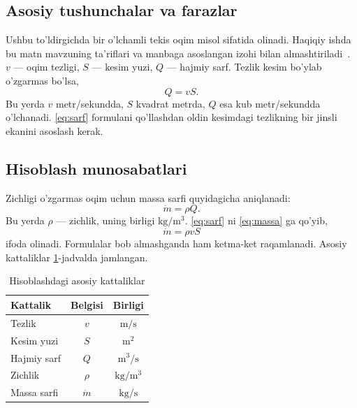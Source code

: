 
\subsection{Asosiy tushunchalar va farazlar}
Ushbu to’ldirgichda bir o’lchamli tekis oqim misol sifatida olinadi.
Haqiqiy ishda bu matn mavzuning ta’riflari va manbaga asoslangan izohi bilan
almashtiriladi~\cite{manba:nazariya}. $v$ --- oqim tezligi, $S$ --- kesim yuzi,
$Q$ --- hajmiy sarf. Tezlik kesim bo’ylab o’zgarmas bo’lsa,
\begin{equation}
  Q = vS.
  \label{eq:sarf}
\end{equation}
Bu yerda $v$ metr/sekundda, $S$ kvadrat metrda, $Q$ esa kub metr/sekundda
o’lchanadi. \eqref{eq:sarf} formulani qo’llashdan oldin kesimdagi tezlikning
bir jinsli ekanini asoslash kerak.

\subsection{Hisoblash munosabatlari}
Zichligi o’zgarmas oqim uchun massa sarfi quyidagicha aniqlanadi:
\begin{equation}
  \dot{m} = \rho Q.
  \label{eq:massa}
\end{equation}
Bu yerda $\rho$ --- zichlik, uning birligi $\mathrm{kg/m^3}$.
\eqref{eq:sarf} ni \eqref{eq:massa} ga qo’yib,
\begin{equation}
  \dot{m} = \rho vS
  \label{eq:umumiy}
\end{equation}
ifoda olinadi. Formulalar bob almashganda ham ketma-ket raqamlanadi.
Asosiy kattaliklar \ref{tab:kattaliklar}-jadvalda jamlangan.

\begin{table}[htbp]
  \centering
  \caption{Hisoblashdagi asosiy kattaliklar}
  \label{tab:kattaliklar}
  \begin{tabular}{|l|c|c|}
    \hline
    Kattalik & Belgisi & Birligi \\
    \hline
    Tezlik & $v$ & $\mathrm{m/s}$ \\
    Kesim yuzi & $S$ & $\mathrm{m^2}$ \\
    Hajmiy sarf & $Q$ & $\mathrm{m^3/s}$ \\
    Zichlik & $\rho$ & $\mathrm{kg/m^3}$ \\
    Massa sarfi & $\dot{m}$ & $\mathrm{kg/s}$ \\
    \hline
  \end{tabular}
\end{table}

